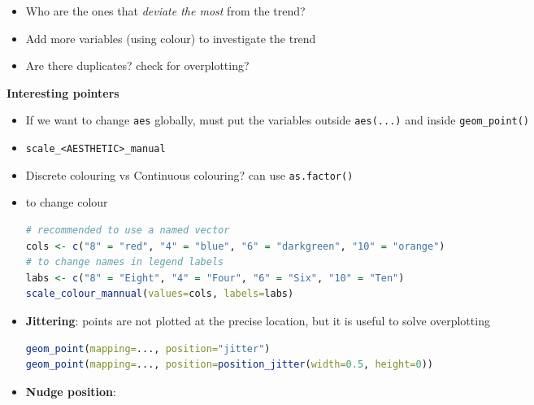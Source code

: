 \documentclass{article}
\begin{document}
\begin{multicols}{2}
\begin{itemize}
\begin{itemize}
	\end{itemize}
    \item Who are the ones that \textit{deviate the most} from the trend?
    \item Add more variables (using colour) to investigate the trend
    \item Are there duplicates? check for overplotting?
\end{itemize}
\textbf{Interesting pointers}
\begin{itemize}
	\item If we want to change \texttt{aes} globally, must put the variables outside \texttt{aes(...)} and inside \texttt{geom\_point()}
	\item \texttt{scale\_<AESTHETIC>\_manual}
	\item Discrete colouring vs Continuous colouring? can use \texttt{as.factor()}
	\item to change colour
	\begin{lstlisting}[language=R]
# recommended to use a named vector
cols <- c("8" = "red", "4" = "blue", "6" = "darkgreen", "10" = "orange")
# to change names in legend labels
labs <- c("8" = "Eight", "4" = "Four", "6" = "Six", "10" = "Ten")
scale_colour_mannual(values=cols, labels=labs)\end{lstlisting}
    \item \textbf{Jittering}: points are not plotted at the precise location, but it is useful to solve overplotting
    \begin{lstlisting}[language=R]
geom_point(mapping=..., position="jitter")
geom_point(mapping=..., position=position_jitter(width=0.5, height=0))\end{lstlisting}
    \item \textbf{Nudge position}:
\end{itemize}

\end{multicols}
\end{document}
